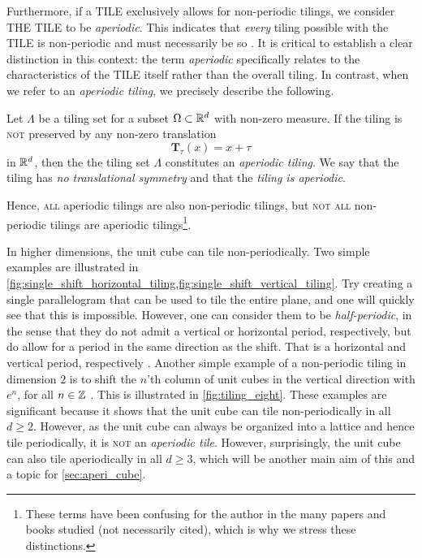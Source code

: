 \documentclass[../thesis.tex]{subfiles}
\begin{document}
Furthermore, if a \textsc{TILE} exclusively allows for non-periodic tilings, we consider \textsc{THE TILE} to be \emph{aperiodic}. This indicates that \emph{every} tiling possible with the \textsc{TILE} is non-periodic and must necessarily be so \cite[p. 520]{grunbaumTilingsPatterns1987}. It is critical to establish a clear distinction in this context: the term \emph{aperiodic} specifically relates to the characteristics of the \textsc{TILE} itself rather than the overall tiling. In contrast, when we refer to an \emph{aperiodic tiling}, we precisely describe the following.
\begin{definition}
    Let $\Lambda$ be a tiling set for a subset $\Omega\subset \mathbb{R}^d$ with non-zero measure. If the tiling is \textsc{not} preserved by any non-zero translation 
    \begin{equation*}
        \mathbf{T}_\tau (x) = x+\tau 
    \end{equation*}
    in $\mathbb{R}^d$, then the the tiling set $\Lambda$ constitutes an \emph{aperiodic tiling}. We say that the tiling has \emph{no translational symmetry} and that the \emph{tiling is aperiodic}.
\end{definition}
Hence, \textsc{all} aperiodic tilings are also non-periodic tilings, but \textsc{not all} non-periodic tilings are aperiodic tilings\footnote[1]{These terms have been confusing for the author in the many papers and books studied (not necessarily cited), which is why we stress these distinctions.}.

In higher dimensions, the unit cube can tile non-periodically. Two simple examples are illustrated in \cref{fig:single_shift_horizontal_tiling,fig:single_shift_vertical_tiling}. Try creating a single parallelogram that can be used to tile the entire plane, and one will quickly see that this is impossible. However, one can consider them to be \emph{half-periodic}, in the sense that they do not admit a vertical or horizontal period, respectively, but do allow for a period in the same direction as the shift. That is a horizontal and vertical period, respectively \cite{kolountzakisTilingsTranslation2010}. Another simple example of a non-periodic tiling in dimension $2$ is to shift the $n$'th column  of unit cubes in the vertical  direction with $e^n$, for all $n\in\mathbb{Z}$ \cite{liuUniformityNonUniformGabor2003}. This is illustrated in \cref{fig:tiling_eight}. These examples are significant because it shows that the unit cube can tile non-periodically in all $d\geq 2$. However, as the unit cube can always be organized into a lattice and hence tile periodically, it is \textsc{not} an \emph{aperiodic tile}. However, surprisingly, the unit cube can also tile aperiodically in all $d\geq 3$, which will be another main aim of this  and a topic for \cref{sec:aperi_cube}.
\end{document}
